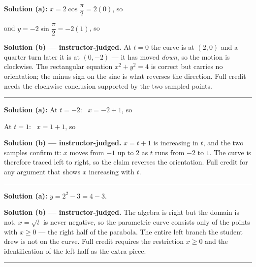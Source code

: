 \documentclass[12pt]{article}
\begin{document}
\textbf{Solution (a):} \quad $x = 2\cos\dfrac{\pi}{2} = 2(0)$, so 

and $y = -2\sin\dfrac{\pi}{2} = -2(1)$, so 

\textbf{Solution (b) --- instructor-judged.} \quad At $t = 0$ the curve is at $(2, 0)$ and a
quarter turn later it is at $(0, -2)$ --- it has moved \emph{down}, so the motion is clockwise.
The rectangular equation $x^2+y^2=4$ is correct but carries no orientation; the minus sign on
the sine is what reverses the direction. Full credit needs the clockwise conclusion supported
by the two sampled points.

\vspace{0.15cm}\noindent\rule{\linewidth}{0.2pt}\vspace{0.15cm}


\textbf{Solution (a):} \quad At $t = -2$: \ $x = -2 + 1$, so 

At $t = 1$: \ $x = 1 + 1$, so 

\textbf{Solution (b) --- instructor-judged.} \quad $x = t + 1$ is increasing in $t$, and the two
samples confirm it: $x$ moves from $-1$ up to $2$ as $t$ runs from $-2$ to $1$. The curve is
therefore traced left to right, so the claim reverses the orientation. Full credit for any
argument that shows $x$ increasing with $t$.

\vspace{0.15cm}\noindent\rule{\linewidth}{0.2pt}\vspace{0.15cm}


\textbf{Solution (a):} \quad $y = 2^2 - 3 = 4 - 3$. 

\textbf{Solution (b) --- instructor-judged.} \quad The algebra is right but the domain is not.
$x = \sqrt{t}$ is never negative, so the parametric curve consists only of the points with
$x \ge 0$ --- the right half of the parabola. The entire left branch the student drew is not on
the curve. Full credit requires the restriction $x \ge 0$ and the identification of the left
half as the extra piece.

\vspace{0.15cm}\noindent\rule{\linewidth}{0.2pt}\vspace{0.15cm}
\end{document}
